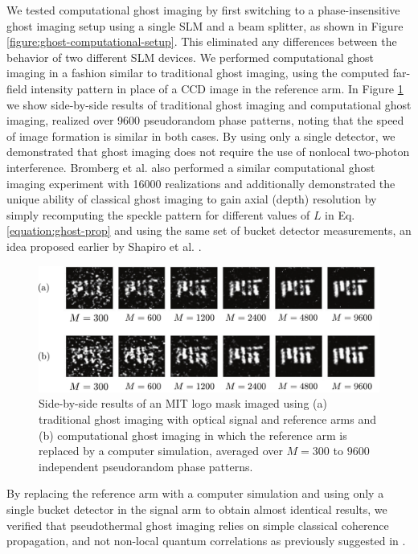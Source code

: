 We tested computational ghost imaging by first switching to a phase-insensitive ghost imaging setup using a single SLM and a beam splitter, as shown in Figure \ref{figure:ghost-computational-setup}. This eliminated any differences between the behavior of two different SLM devices. We performed computational ghost imaging in a fashion similar to traditional ghost imaging, using the computed far-field intensity pattern in place of a CCD image in the reference arm. In Figure \ref{figure:ghost-computational-result} we show side-by-side results of traditional ghost imaging and computational ghost imaging, realized over 9600 pseudorandom phase patterns, noting that the speed of image formation is similar in both cases. By using only a single detector, we demonstrated that ghost imaging does not require the use of nonlocal two-photon interference. Bromberg et al. \cite{bromberg-ghost} also performed a similar computational ghost imaging experiment with 16000 realizations and additionally demonstrated the unique ability of classical ghost imaging to gain axial (depth) resolution by simply recomputing the speckle pattern for different values of $L$ in Eq. \ref{equation:ghost-prop} and using the same set of bucket detector measurements, an idea proposed earlier by Shapiro et al. \cite{shapiro-computational}.

\begin{figure}[t]
\begin{center}
\includegraphics[width=16cm]{figure-ghost-computational-result.pdf}
\caption{Side-by-side results of an MIT logo mask imaged using (a) traditional ghost imaging with optical signal and reference arms and (b) computational ghost imaging in which the reference arm is replaced by a computer simulation, averaged over $M = 300$ to $9600$ independent pseudorandom phase patterns.}
\label{figure:ghost-computational-result}
\end{center}
\end{figure}

By replacing the reference arm with a computer simulation and using only a single bucket detector in the signal arm to obtain almost identical results, we verified that pseudothermal ghost imaging relies on simple classical coherence propagation, and not non-local quantum correlations as previously suggested in \cite{scarcelli-can}.

